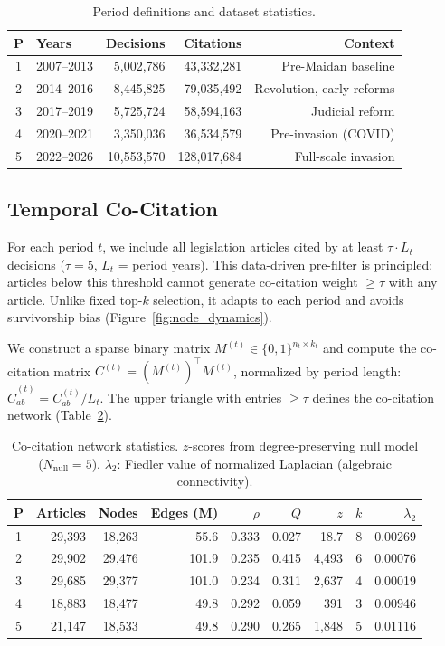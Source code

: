 \documentclass[11pt]{article}
\begin{document}
\begin{table}[t]
\centering
\small
\caption{Period definitions and dataset statistics.}
\label{tab:periods}
\begin{tabular}{@{}clrrr@{}}
\toprule
\textbf{P} & \textbf{Years} & \textbf{Decisions} & \textbf{Citations} & \textbf{Context} \\
\midrule
1 & 2007--2013 & 5,002,786 & 43,332,281 & Pre-Maidan baseline \\
2 & 2014--2016 & 8,445,825 & 79,035,492 & Revolution, early reforms \\
3 & 2017--2019 & 5,725,724 & 58,594,163 & Judicial reform \\
4 & 2020--2021 & 3,350,036 & 36,534,579 & Pre-invasion (COVID) \\
5 & 2022--2026 & 10,553,570 & 128,017,684 & Full-scale invasion \\
\bottomrule
\end{tabular}
\end{table}

\subsection{Temporal Co-Citation}

For each period $t$, we include all legislation articles cited by at least $\tau \cdot L_t$ decisions ($\tau = 5$, $L_t$ = period years).
This data-driven pre-filter is principled: articles below this threshold cannot generate co-citation weight $\geq \tau$ with any article.
Unlike fixed top-$k$ selection, it adapts to each period and avoids survivorship bias (Figure~\ref{fig:node_dynamics}).

We construct a sparse binary matrix $M^{(t)} \in \{0,1\}^{n_t \times k_t}$ and compute the co-citation matrix $C^{(t)} = (M^{(t)})^\top M^{(t)}$, normalized by period length: $\hat{C}^{(t)}_{ab} = C^{(t)}_{ab} / L_t$.
The upper triangle with entries $\geq \tau$ defines the co-citation network (Table~\ref{tab:cocitation}).

\begin{table}[t]
\centering
\small
\caption{Co-citation network statistics. $z$-scores from degree-preserving null model ($N_{\text{null}} = 5$). $\lambda_2$: Fiedler value of normalized Laplacian (algebraic connectivity).}
\label{tab:cocitation}
\begin{tabular}{@{}crrrrrrrr@{}}
\toprule
\textbf{P} & \textbf{Articles} & \textbf{Nodes} & \textbf{Edges (M)} & $\rho$ & \textbf{$Q$} & \textbf{$z$} & \textbf{$k$} & $\lambda_2$ \\
\midrule
1 & 29,393 & 18,263 & 55.6 & 0.333 & 0.027 & 18.7 & 8 & 0.00269 \\
2 & 29,902 & 29,476 & 101.9 & 0.235 & 0.415 & 4,493 & 6 & 0.00076 \\
3 & 29,685 & 29,377 & 101.0 & 0.234 & 0.311 & 2,637 & 4 & 0.00019 \\
4 & 18,883 & 18,477 & 49.8 & 0.292 & 0.059 & 391 & 3 & 0.00946 \\
5 & 21,147 & 18,533 & 49.8 & 0.290 & 0.265 & 1,848 & 5 & 0.01116 \\
\bottomrule
\end{tabular}
\end{table}
\end{document}
